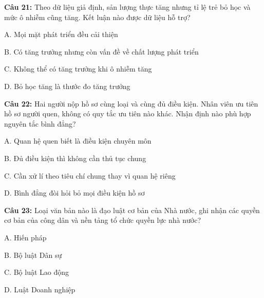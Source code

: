\documentclass[12pt,a4paper]{article}
\begin{document}
\par\noindent\begin{minipage}{\linewidth}
\noindent\textbf{Câu 21:} Theo dữ liệu giả định, sản lượng thực tăng nhưng tỉ lệ trẻ bỏ học và mức ô nhiễm cũng tăng. Kết luận nào được dữ liệu hỗ trợ?\par
\noindent A. Mọi mặt phát triển đều cải thiện\par
\noindent B. Có tăng trưởng nhưng còn vấn đề về chất lượng phát triển\par
\noindent C. Không thể có tăng trưởng khi ô nhiễm tăng\par
\noindent D. Bỏ học tăng là thước đo tăng trưởng\par
\end{minipage}\par\vspace{0.12cm}

\par\noindent\begin{minipage}{\linewidth}
\noindent\textbf{Câu 22:} Hai người nộp hồ sơ cùng loại và cùng đủ điều kiện. Nhân viên ưu tiên hồ sơ người quen, không có quy tắc ưu tiên nào khác. Nhận định nào phù hợp nguyên tắc bình đẳng?\par
\noindent A. Quan hệ quen biết là điều kiện chuyên môn\par
\noindent B. Đủ điều kiện thì không cần thủ tục chung\par
\noindent C. Cần xử lí theo tiêu chí chung thay vì quan hệ riêng\par
\noindent D. Bình đẳng đòi hỏi bỏ mọi điều kiện hồ sơ\par
\end{minipage}\par\vspace{0.12cm}

\par\noindent\begin{minipage}{\linewidth}
\noindent\textbf{Câu 23:} Loại văn bản nào là đạo luật cơ bản của Nhà nước, ghi nhận các quyền cơ bản của công dân và nền tảng tổ chức quyền lực nhà nước?\par
\noindent A. Hiến pháp\par
\noindent B. Bộ luật Dân sự\par
\noindent C. Bộ luật Lao động\par
\noindent D. Luật Doanh nghiệp\par
\end{minipage}\par\vspace{0.12cm}
\end{document}

